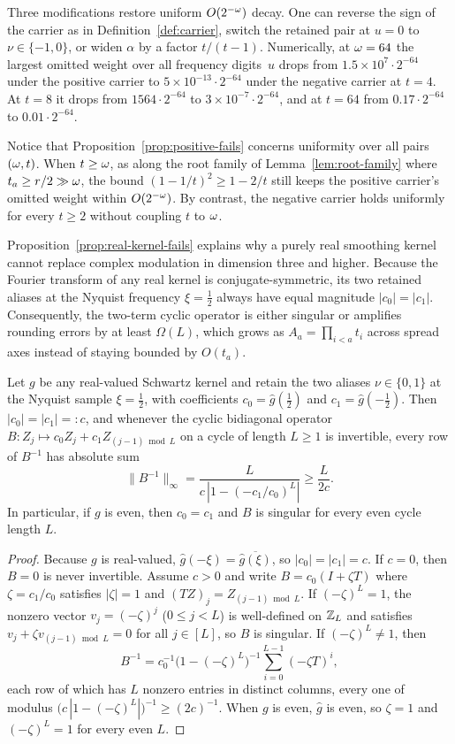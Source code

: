 Three modifications restore uniform $O(2^{-\omega})$ decay. One can reverse the sign of the carrier as in Definition~\ref{def:carrier}, switch the retained pair at $u=0$ to $\nu\in\{-1,0\}$, or widen $\alpha$ by a factor $t/(t-1)$. Numerically, at $\omega=64$ the largest omitted weight over all frequency digits~$u$ drops from $1.5\times 10^7\cdot 2^{-64}$ under the positive carrier to $5\times 10^{-13}\cdot 2^{-64}$ under the negative carrier at $t=4$. At $t=8$ it drops from $1564\cdot 2^{-64}$ to $3\times 10^{-7}\cdot 2^{-64}$, and at $t=64$ from $0.17\cdot 2^{-64}$ to $0.01\cdot 2^{-64}$.

Notice that Proposition~\ref{prop:positive-fails} concerns uniformity over all pairs $(\omega,t)$. When $t\ge\omega$, as along the root family of Lemma~\ref{lem:root-family} where $t_a\ge r/2\gg\omega$, the bound $(1-1/t)^2\ge 1-2/t$ still keeps the positive carrier's omitted weight within $O(2^{-\omega})$. By contrast, the negative carrier holds uniformly for every $t\ge 2$ without coupling $t$ to $\omega$.

Proposition~\ref{prop:real-kernel-fails} explains why a purely real smoothing kernel cannot replace complex modulation in dimension three and higher. Because the Fourier transform of any real kernel is conjugate-symmetric, its two retained aliases at the Nyquist frequency $\xi=\tfrac12$ always have equal magnitude $|c_0|=|c_1|$. Consequently, the two-term cyclic operator is either singular or amplifies rounding errors by at least $\Omega(L)$, which grows as $A_a=\prod_{i<a}t_i$ across spread axes instead of staying bounded by $O(t_a)$.

\begin{proposition}\label{prop:real-kernel-fails}
Let $g$ be any real-valued Schwartz kernel and retain the two aliases $\nu\in\{0,1\}$ at the Nyquist sample
$\xi=\tfrac12$, with coefficients $c_0=\hat g(\tfrac12)$ and $c_1=\hat g(-\tfrac12)$. Then $|c_0|=|c_1|=:c$, and
whenever the cyclic bidiagonal operator $B\colon Z_j\mapsto c_0 Z_j+c_1 Z_{(j-1)\bmod L}$ on a cycle of length $L\ge 1$
is invertible, every row of $B^{-1}$ has absolute sum
\[
  \|B^{-1}\|_\infty=\frac{L}{c\,|1-(-c_1/c_0)^L|}\ge\frac{L}{2c}.
\]
In particular, if $g$ is even, then $c_0=c_1$ and $B$ is singular for every even cycle length $L$.
\end{proposition}

\begin{proof}
Because $g$ is real-valued, $\hat g(-\xi)=\overline{\hat g(\xi)}$, so $|c_0|=|c_1|=c$. If $c=0$, then $B=0$ is never
invertible. Assume $c>0$ and write $B=c_0(I+\zeta T)$ where $\zeta=c_1/c_0$ satisfies $|\zeta|=1$ and
$(TZ)_j=Z_{(j-1)\bmod L}$. If $(-\zeta)^L=1$, the nonzero vector $v_j=(-\zeta)^j$ ($0\le j<L$) is well-defined on
$\mathbb{Z}_L$ and satisfies $v_j+\zeta v_{(j-1)\bmod L}=0$ for all $j\in[L]$, so $B$ is singular. If $(-\zeta)^L\ne 1$, then
\[
  B^{-1}=c_0^{-1}\bigl(1-(-\zeta)^L\bigr)^{-1}\sum_{i=0}^{L-1}(-\zeta T)^i,
\]
each row of which has $L$ nonzero entries in distinct columns, every one of modulus
$\bigl(c\,|1-(-\zeta)^L|\bigr)^{-1}\ge(2c)^{-1}$. When $g$ is even, $\hat g$ is even, so $\zeta=1$ and $(-\zeta)^L=1$
for every even $L$.
\end{proof}

